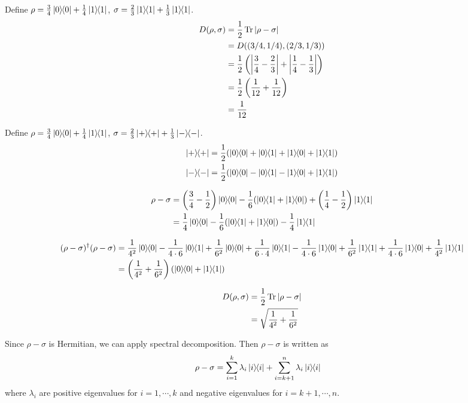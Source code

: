 
Define $\rho = \frac{3}{4}\ket{0}\hspace{-1mm} \bra{0} + \frac{1}{4}\ket{1}\hspace{-1mm} \bra{1}$, $\sigma = \frac{2}{3} \ket{1}\hspace{-1mm} \bra{1} + \frac{1}{3}\ket{1}\hspace{-1mm} \bra{1}$.
\begin{align*}
	D(\rho, \sigma) &= \frac{1}{2} \operatorname{Tr} |\rho - \sigma|\\
		&= D((3/4, 1/4), (2/3, 1/3))\\
		&= \frac{1}{2} \left(\left| \frac{3}{4} - \frac{2}{3}  \right| +\left| \frac{1}{4} - \frac{1}{3} \right| \right)\\
		&= \frac{1}{2} \left( \frac{1}{12} + \frac{1}{12} \right)\\
		&= \frac{1}{12}
\end{align*}


Define $\rho = \frac{3}{4}\ket{0}\hspace{-1mm} \bra{0} + \frac{1}{4}\ket{1}\hspace{-1mm} \bra{1}$, $\sigma = \frac{2}{3} \ket{+}\hspace{-1mm} \bra{+} + \frac{1}{3}\ket{-}\hspace{-1mm} \bra{-}$.
\begin{align*}
	\kb{+} &= \frac{1}{2} (\kb{0} + \kbt{0}{1} + \kbt{1}{0} + \kb{1})\\
	\kb{-} &= \frac{1}{2} (\kb{0} - \kbt{0}{1} - \kbt{1}{0} + \kb{1})
\end{align*}

\begin{align*}
	\rho - \sigma &= \left(\frac{3}{4} - \frac{1}{2}\right) \kb{0} - \frac{1}{6} (\kbt{0}{1} + \kbt{1}{0}) + \left(\frac{1}{4} - \frac{1}{2}\right) \kb{1}\\
		&= \frac{1}{4} \kb{0} - \frac{1}{6} (\kbt{0}{1} + \kbt{1}{0}) - \frac{1}{4} \kb{1}\\
\end{align*}

\begin{align*}
	(\rho - \sigma)^\dagger (\rho - \sigma) &= \frac{1}{4^2} \kb{0} - \frac{1}{4\cdot 6} \kbt{0}{1} + \frac{1}{6^2} \kb{0} + \frac{1}{6 \cdot 4} \kbt{0}{1} - \frac{1}{4\cdot 6} \kbt{1}{0} + \frac{1}{6^2} \kb{1} + \frac{1}{4\cdot 6} \kbt{1}{0} + \frac{1}{4^2} \kb{1}\\
		&= \left(\frac{1}{4^2} + \frac{1}{6^2}\right) (\kb{0} + \kb{1})
\end{align*}


\begin{align*}
	D(\rho, \sigma) &= \frac{1}{2} \operatorname{Tr} |\rho - \sigma|\\
		&= \sqrt{\frac{1}{4^2} + \frac{1}{6^2}}
\end{align*}




Since $\rho - \sigma$ is Hermitian, we can apply spectral decomposition.
Then $\rho - \sigma$ is written as
\begin{align*}
	\rho - \sigma &= \sum_{i=1}^k \lambda_i \ket{i}\hspace{-1mm} \bra{i} + \sum_{i=k+1}^{n} \lambda_i \ket{i}\hspace{-1mm} \bra{i}
\end{align*}
where $\lambda_i$ are  positive eigenvalues for $i = 1, \cdots, k$ and negative eigenvalues for $i = k+1, \cdots, n$.

